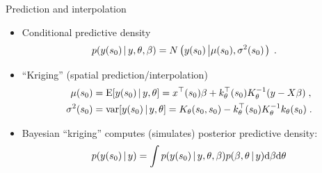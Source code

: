 \begin{frame}{Prediction and interpolation}

 \begin{itemize}\setlength{\itemsep}{0.75cm}
  \item Conditional predictive density 
\begin{align*}
p(y(s_0)\,|\, y, \theta, \beta) &= N\left(y(s_0)\left| \mu(s_0), \sigma^2(s_0)\right.\right)\;.
\end{align*}

\item ``Kriging'' (spatial prediction/interpolation)
\begin{align*}
 \mu(s_0) &= \mbox{E}[y(s_0)\,|\, y,\theta] = x^{\top}(s_0)\beta + k_{\theta}^{\top}(s_0)K^{-1}_{\theta}(y-X\beta)\;, \\
 \sigma^2(s_0) &= \mbox{var}[y(s_0)\,|\, y,\theta] = K_{\theta}(s_0,s_0) - k_{\theta}^{\top}(s_0)K^{-1}_{\theta}k_{\theta}(s_0)\; .  
\end{align*}
 
  \item Bayesian ``kriging'' computes (simulates) posterior predictive density:
\[
 p(y(s_0)\,|\, y) = \int p(y(s_0)\,|\, y, \theta, \beta) p(\beta, \theta \,|\, y) \mbox{d}\beta\mbox{d}\theta  
\]
  
 \end{itemize}

\end{frame}

